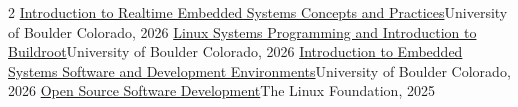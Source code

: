 \documentclass[9pt,a4paper,withhyper]{altacv}
\begin{document}
\begin{paracol}{2}
  \cvachievement{\faCertificate} 
  {\href{https://coursera.org/verify/WKAEU5CXMT0V}{Introduction to Realtime Embedded Systems Concepts and Practices}}{University of Boulder Colorado, 2026}
  \cvachievement{\faCertificate} 
  {\href{https://www.coursera.org/verify/WYCY2A5EZ6RG}{Linux Systems Programming and Introduction to Buildroot}}{University of Boulder Colorado, 2026}
  \cvachievement{\faCertificate} 
  {\href{https://www.coursera.org/verify/QGONDNKH2CED}{Introduction to Embedded Systems Software and Development Environments}}{University of Boulder Colorado, 2026}
  \cvachievement{\faCertificate} 
  {\href{https://www.coursera.org/verify/specialization/ZUCSRB5PTGA4}{Open Source Software Development}}{The Linux Foundation, 2025}

  \divider


%

\end{paracol}
\end{document}
